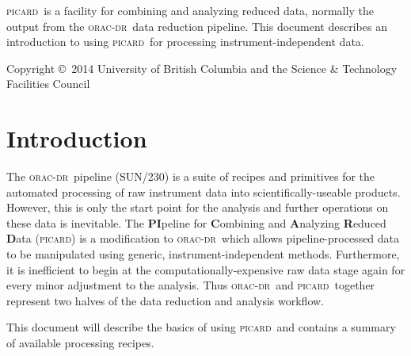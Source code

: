 \documentclass[twoside,11pt]{article}
\newcommand{\stardocinitials}  {SUN}
\newcommand{\stardoccopyright}
{Copyright \copyright\ 2014 University of British Columbia and the Science \& Technology Facilities Council}
\newcommand{\stardocnumber}    {265.0}
\newcommand{\stardocabstract}  {

  \picard\ is a facility for combining and analyzing reduced data,
  normally the output from the \oracdr\ data reduction pipeline. This
  document describes an introduction to using \picard\ for processing
  instrument-independent data.

}
\newcommand{\stardocname}{\stardocinitials /\stardocnumber}
\newenvironment{latexonly}{}{}
\newcommand{\xref}[3]{#1}
\newcommand{\xlabel}[1]{}
\renewcommand{\_}{\texttt{\symbol{95}}}
\newcommand{\oracdr}{\textsc{orac-dr}}
\newcommand{\oracsun}{\xref{SUN/230}{sun230}{}}
\newcommand{\picard}{\textsc{picard}}
\renewcommand{\thepage}{\roman{page}}
\begin{document}
\stardocabstract

\begin{latexonly}
\newpage
\vspace*{\fill}
\stardoccopyright
\end{latexonly}

  \newpage
  \begin{latexonly}
    \setlength{\parskip}{0mm}
    \tableofcontents
    \setlength{\parskip}{\medskipamount}
    \markboth{\stardocname}{\stardocname}
  \end{latexonly}

\cleardoublepage
\renewcommand{\thepage}{\arabic{page}}
\setcounter{page}{1}


\section{\xlabel{introduction}Introduction\label{se:intro}}

The \oracdr\ pipeline (\oracsun) is a suite of recipes and primitives
for the automated processing of raw instrument data into
scientifically-useable products. However, this is only the start point
for the analysis and further operations on these data is
inevitable. The \textbf{PI}peline for \textbf{C}ombining and
\textbf{A}nalyzing \textbf{R}educed \textbf{D}ata (\picard) is a
modification to \oracdr\ which allows pipeline-processed data to be
manipulated using generic, instrument-independent
methods. Furthermore, it is inefficient to begin at the
computationally-expensive raw data stage again for every minor
adjustment to the analysis. Thus \oracdr\ and \picard\ together
represent two halves of the data reduction and analysis workflow.

This document will describe the basics of using \picard\ and contains
a summary of available processing recipes.
\end{document}
